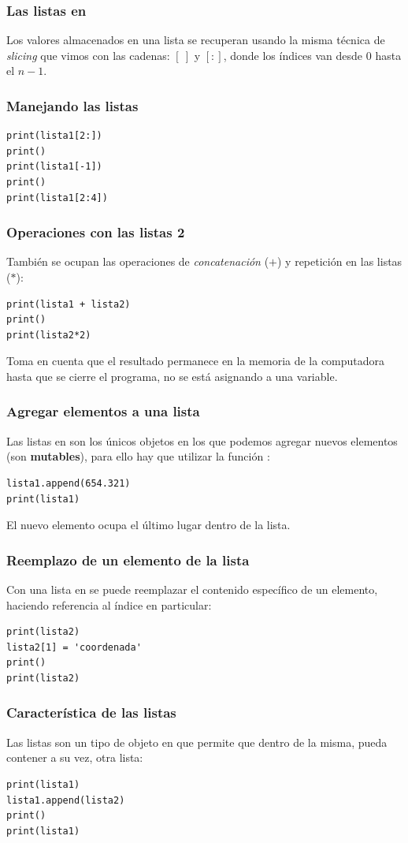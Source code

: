 \documentclass[12pt]{beamer}
\begin{document}
\begin{frame}
\frametitle{Las listas en \python}
Los valores almacenados en una lista se recuperan usando la misma técnica de \emph{slicing} que vimos con las cadenas: \pause $[ \: ]$ y $[:]$, \pause donde los índices van desde  $0$ hasta el   $n - 1$.
\end{frame}
\begin{frame}[fragile]
\frametitle{Manejando las listas}
\begin{lstlisting}[caption=Usando el slicing en una lista]
print(lista1[2:])
print()
print(lista1[-1])
print()
print(lista1[2:4])
\end{lstlisting}
\end{frame}
\begin{frame}[fragile]
\frametitle{Operaciones con las listas 2}
También se ocupan las operaciones de \emph{concatenación} ($+$) \pause y repetición en las listas ($*$):
\pause
\begin{lstlisting}[caption=Concatenación y repetición de listas]
print(lista1 + lista2)
print()
print(lista2*2)
\end{lstlisting}
\pause
Toma en cuenta que el resultado permanece en la memoria de la computadora hasta que se cierre el programa, no se está asignando a una variable.
\end{frame}
\begin{frame}[fragile]
\frametitle{Agregar elementos a una lista}
Las listas en \python{} son los únicos objetos en los que podemos agregar nuevos elementos (son \textbf{mutables}), para ello hay que utilizar la función :
\pause
\begin{lstlisting}[caption=Agregando un elemento a la lista]
lista1.append(654.321)
print(lista1)
\end{lstlisting}
\pause
El nuevo elemento ocupa el último lugar dentro de la lista.
\end{frame}
\begin{frame}[fragile]
\frametitle{Reemplazo de un elemento de la lista}
Con una lista en \python{} se puede reemplazar el contenido específico de un elemento, haciendo referencia al índice en particular:
\pause
\begin{lstlisting}[caption=Modificando el contenido de un elemento de la lista]
print(lista2)
lista2[1] = 'coordenada'
print()
print(lista2)
\end{lstlisting}
\end{frame}
\begin{frame}[fragile]
\frametitle{Característica de las listas}
Las listas son un tipo de objeto en \python{} que permite que dentro de la misma, pueda contener a su vez, otra lista:
\pause
\begin{lstlisting}[caption=Una lista dentro de una lista]
print(lista1)
lista1.append(lista2)
print()
print(lista1)
\end{lstlisting}
\end{frame}
\end{document}
